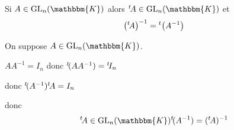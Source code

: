 \begin{crlr}
	Si $A \in \mathrm{GL}_n(\mathbbm{K})$ alors $\t A \in \mathrm{GL}_n(\mathbbm{K})$ et \[
		\left( {}^t\! A \right) ^{-1} = {}^t\! \left( A^{-1} \right) 
	\]
\end{crlr}

\begin{prv}
	On suppose $A \in \mathrm{GL}_n(\mathbbm{K})$.

	$A A^{-1} = I_n$ donc ${}^t\!(A A^{-1}) = {}^t\! I_n$

	donc ${}^t\!(A^{-1}) {}^t\! A = I_n$ 

	donc \[
		\t A \in \mathrm{GL}_n(\mathbbm{K})\\
		\t (A^{-1}) = (\t A)^{-1}
	\]
\end{prv}












